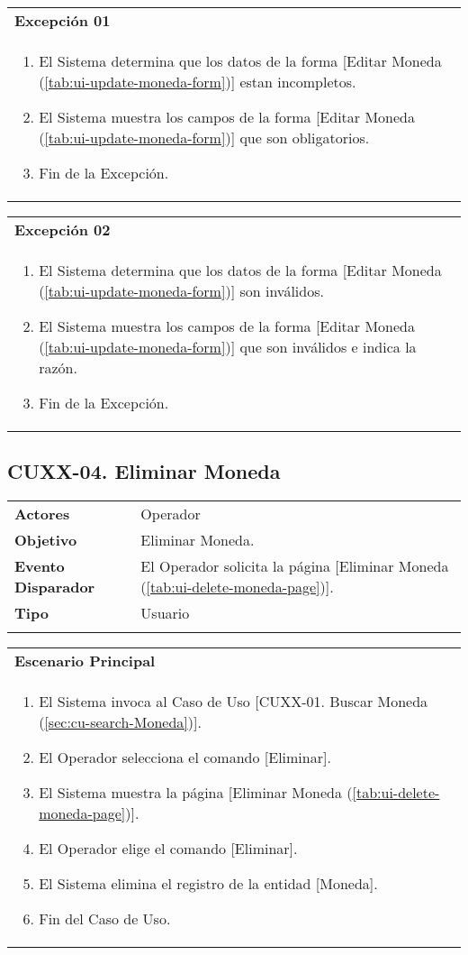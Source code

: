 \begin{tabular}{ p{15.5cm} }
	\textbf{Excepción 01} \\
	\begin{enumerate}
		\item El Sistema determina que los datos de la forma [Editar Moneda (\ref{tab:ui-update-moneda-form})] estan incompletos.
		\item El Sistema muestra los campos de la forma [Editar Moneda (\ref{tab:ui-update-moneda-form})] que son obligatorios.
		\item Fin de la Excepción.
	\end{enumerate}
\end{tabular}

\begin{tabular}{ p{15.5cm} }
	\textbf{Excepción 02} \\
	\begin{enumerate}
		\item El Sistema determina que los datos de la forma [Editar Moneda (\ref{tab:ui-update-moneda-form})] son inválidos.
		\item El Sistema muestra los campos de la forma [Editar Moneda (\ref{tab:ui-update-moneda-form})] que son inválidos e indica la razón.
		\item Fin de la Excepción.
	\end{enumerate}
\end{tabular}


\clearpage
\subsection{CUXX-04. Eliminar Moneda} \label{sec:cu-delete-Moneda}

\begin{tabular}{ p{3.5cm} p{11.5cm} }
	\textbf{Actores} & Operador\\
	\textbf{Objetivo} & Eliminar Moneda.\\
	\textbf{Evento Disparador} & El Operador solicita la página [Eliminar Moneda (\ref{tab:ui-delete-moneda-page})].\\
	\textbf{Tipo} & Usuario\\
	\\
\end{tabular}

\begin{tabular}{ p{15.5cm} }
	\textbf{Escenario Principal} \\
	\begin{enumerate}
		\item El Sistema invoca al Caso de Uso [CUXX-01. Buscar Moneda (\ref{sec:cu-search-Moneda})].
		\item El Operador selecciona el comando [Eliminar].
		\item El Sistema muestra la página [Eliminar Moneda (\ref{tab:ui-delete-moneda-page})].
		\item El Operador elige el comando [Eliminar].
		\item El Sistema elimina el registro de la entidad [Moneda].
		\item Fin del Caso de Uso.
	\end{enumerate}
\end{tabular}


